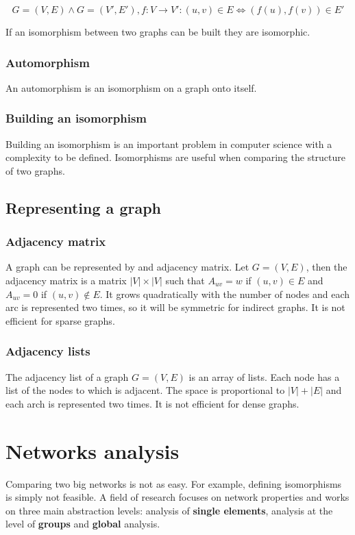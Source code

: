 	$$G = (V,E)\land G = (V',E'), f:V \rightarrow V': (u, v)\in E\Leftrightarrow (f(u), f(v))\in E'$$

	If an isomorphism between two graphs can be built they are isomorphic.

		\subsubsection{Automorphism}
		An automorphism is an isomorphism on a graph onto itself.

		\subsubsection{Building an isomorphism}
		Building an isomorphism is an important problem in computer science with a complexity to be defined.
		Isomorphisms are useful when comparing the structure of two graphs.

	\subsection{Representing a graph}

		\subsubsection{Adjacency matrix}
		A graph can be represented by and adjacency matrix.
		Let $G = (V,E)$, then the adjacency matrix is a matrix $|V|\times|V|$ such that $A_{uv} = w$ if $(u,v)\in E$ and $A_{uv} = 0$ if $(u,v)\not\in E$.
		It grows quadratically with the number of nodes and each arc is represented two times, so it will be symmetric for indirect graphs.
		It is not efficient for sparse graphs.

		\subsubsection{Adjacency lists}
		The adjacency list of a graph $G=(V,E)$ is an array of lists.
		Each node has a list of the nodes to which is adjacent.
		The space is proportional to $|V|+|E|$ and each arch is represented two times.
		It is not efficient for dense graphs.

\section{Networks analysis}
Comparing two big networks is not as easy. For example, defining isomorphisms is simply not feasible. 
A field of research focuses on network properties and works on three main abstraction levels: analysis of \textbf{single elements}, analysis at the level of \textbf{groups} and \textbf{global} analysis.

